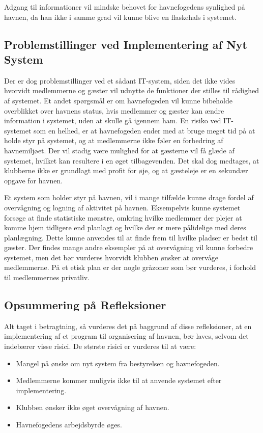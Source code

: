 Adgang til informationer vil mindske behovet for havnefogedens synlighed på havnen, da han ikke i samme grad vil kunne blive en flaskehals i systemet.

\subsection{Problemstillinger ved Implementering af Nyt System}

Der er dog problemstillinger ved et sådant IT-system, siden det ikke vides hvorvidt medlemmerne og gæster vil udnytte de funktioner der stilles til rådighed af systemet. Et andet spørgsmål er om havnefogeden vil kunne bibeholde overblikket over havnens status, hvis medlemmer og gæster kan ændre information i systemet, uden at skulle gå igennem ham. En risiko ved IT-systemet som en helhed, er at havnefogeden ender med at bruge meget tid på at holde styr på systemet, og at medlemmerne ikke føler en forbedring af havnemiljøet. Der vil stadig være mulighed for at gæsterne vil få glæde af systemet, hvilket kan resultere i en øget tilbagevenden. Det skal dog medtages, at klubberne ikke er grundlagt med profit for øje, og at gæsteleje er en sekundær opgave for havnen.

Et system som holder styr på havnen, vil i mange tilfælde kunne drage fordel af overvågning og logning af aktivitet på havnen. Eksempelvis kunne systemet forsøge at finde statistiske mønstre, omkring hvilke medlemmer der plejer at komme hjem tidligere end planlagt og hvilke der er mere pålidelige med deres planlægning. Dette kunne anvendes til at finde frem til hvilke pladser er bedst til gæster. Der findes mange andre eksempler på at overvågning vil kunne forbedre systemet, men det bør vurderes hvorvidt klubben ønsker at overvåge medlemmerne. På et etisk plan er der nogle gråzoner som bør vurderes, i forhold til medlemmernes privatliv.

\subsection{Opsummering på Refleksioner}
\label{Opsummering_på_Refleksioner}

Alt taget i betragtning, så vurderes det på baggrund af disse refleksioner, at en implementering af et program til organisering af havnen, bør laves, selvom det indebærer visse risici. De største risici er vurderes til at være:

\begin{itemize}
  \item Mangel på ønske om nyt system fra bestyrelsen og havnefogeden.
  \item Medlemmerne kommer muligvis ikke til at anvende systemet efter implementering.
  \item Klubben ønsker ikke øget overvågning af havnen.
  \item Havnefogedens arbejdsbyrde øges.
\end{itemize}

